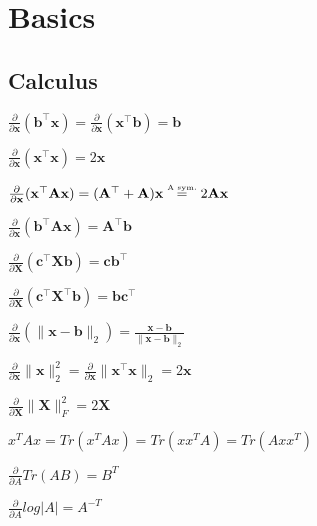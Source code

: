 \section{Basics}
\subsection*{Calculus}
\begin{inparaitem}[$\color{mygreen} \triangleright$]
	\item $\frac{\partial}{\partial \mathbf{x}}(\mathbf{b}^\top \mathbf{x}) = \frac{\partial}{\partial \mathbf{x}}(\mathbf{x}^\top \mathbf{b}) = \mathbf{b}$ \quad
	\item $\frac{\partial}{\partial \mathbf{x}}(\mathbf{x}^\top \mathbf{x}) = 2\mathbf{x}$ \\
	\item $\frac{\partial}{\partial \mathbf{x}}(\mathbf{x}^\top \mathbf{A}\mathbf{x}) = (\mathbf{A}^\top + \mathbf{A})\mathbf{x} \stackrel{\text{\tiny A sym.}}{=} 2\mathbf{A}\mathbf{x}$ \\
	\item $\frac{\partial}{\partial \mathbf{x}}(\mathbf{b}^\top \mathbf{A}\mathbf{x}) = \mathbf{A}^\top \mathbf{b}$ \quad
	\item $\frac{\partial}{\partial \mathbf{X}}(\mathbf{c}^\top \mathbf{X} \mathbf{b}) = \mathbf{c}\mathbf{b}^\top$ \\
	\item $\frac{\partial}{\partial \mathbf{X}}(\mathbf{c}^\top \mathbf{X}^\top \mathbf{b}) = \mathbf{b}\mathbf{c}^\top$ \quad
	\item $\frac{\partial}{\partial \mathbf{x}}(\| \mathbf{x}-\mathbf{b} \|_2) = \frac{\mathbf{x}-\mathbf{b}}{\|\mathbf{x}-\mathbf{b}\|_2}$ \\
	\item $\frac{\partial}{\partial \mathbf{x}}\|\mathbf{x}\|^2_2 = \frac{\partial}{\partial \mathbf{x}} \|\mathbf{x}^\top \mathbf{x}\|_2 = 2\mathbf{x}$ \quad
	\item $\frac{\partial}{\partial \mathbf{X}}\|\mathbf{X}\|_F^2 = 2\mathbf{X}$ \\
	\item $x^T A x = Tr(x^T A x) = Tr(x x^T A) = Tr(A x x^T)$ \\
	\item $\tfrac{\partial}{\partial A} Tr(AB) {=} B^T$ \quad
	\item $\frac{\partial}{\partial A} log|A| {=} A^{-T}$ \\
\end{inparaitem}
